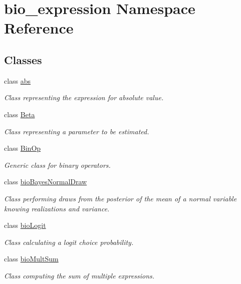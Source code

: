 \hypertarget{namespacebio__expression}{\section{bio\+\_\+expression Namespace Reference}
\label{namespacebio__expression}
}
\subsection*{Classes}
\begin{DoxyCompactItemize}
\item 
class \hyperlink{classbio__expression_1_1abs}{abs}
\begin{DoxyCompactList}\small\item\em Class representing the expression for absolute value. \end{DoxyCompactList}\item 
class \hyperlink{classbio__expression_1_1_beta}{Beta}
\begin{DoxyCompactList}\small\item\em Class representing a parameter to be estimated. \end{DoxyCompactList}\item 
class \hyperlink{classbio__expression_1_1_bin_op}{Bin\+Op}
\begin{DoxyCompactList}\small\item\em Generic class for binary operators. \end{DoxyCompactList}\item 
class \hyperlink{classbio__expression_1_1bio_bayes_normal_draw}{bio\+Bayes\+Normal\+Draw}
\begin{DoxyCompactList}\small\item\em Class performing draws from the posterior of the mean of a normal variable knowing realizations and variance. \end{DoxyCompactList}\item 
class \hyperlink{classbio__expression_1_1bio_logit}{bio\+Logit}
\begin{DoxyCompactList}\small\item\em Class calculating a logit choice probability. \end{DoxyCompactList}\item 
class \hyperlink{classbio__expression_1_1bio_mult_sum}{bio\+Mult\+Sum}
\begin{DoxyCompactList}\small\item\em Class computing the sum of multiple expressions. \end{DoxyCompactList}\item 

\end{DoxyCompactItemize}
